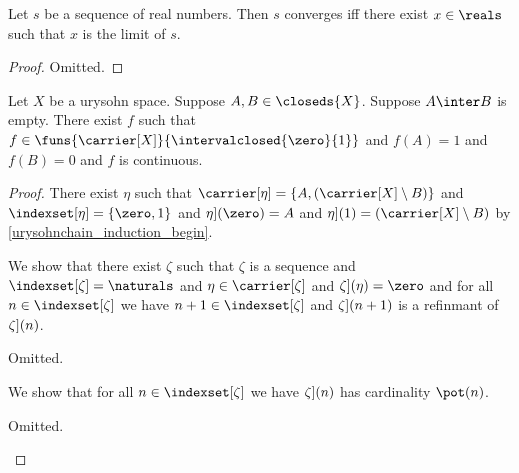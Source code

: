 \begin{proposition}\label{existence_of_limit}
    Let $s$ be a sequence of real numbers.
    Then $s$ converges iff there exist $x \in \reals$ 
    such that $x$ is the limit of $s$.
\end{proposition}
\begin{proof}
    Omitted.
\end{proof}




\begin{theorem}\label{urysohn}
    Let $X$ be a urysohn space.
    Suppose $A,B \in \closeds{X}$.
    Suppose $A \inter B$ is empty.
    There exist $f$ such that $f \in \funs{\carrier[X]}{\intervalclosed{\zero}{1}}$ 
    and $f(A) = 1$ and $f(B)= 0$ and $f$ is continuous.
\end{theorem}
\begin{proof}

    There exist $\eta$ such that $\carrier[\eta] = \{A, (\carrier[X] \setminus B)\}$ 
    and $\indexset[\eta] = \{\zero, 1\}$ 
    and $\index[\eta](\zero) = A$
    and $\index[\eta](1) = (\carrier[X] \setminus B)$  by \cref{urysohnchain_induction_begin}.
    
    We show that there exist $\zeta$ such that $\zeta$ is a sequence 
    and $\indexset[\zeta] = \naturals$
    and $\eta \in \carrier[\zeta]$ and $\index[\zeta](\eta) = \zero$
    and for all $n \in \indexset[\zeta]$ we have $n+1 \in \indexset[\zeta]$ 
    and $\index[\zeta](n+1)$ is a refinmant of $\index[\zeta](n)$.
    \begin{subproof}
        Omitted.
    \end{subproof}

    We show that for all $n \in \indexset[\zeta]$ we have $\index[\zeta](n)$ has cardinality $\pot(n)$.
    \begin{subproof}
        Omitted.
    \end{subproof}


\end{proof}
